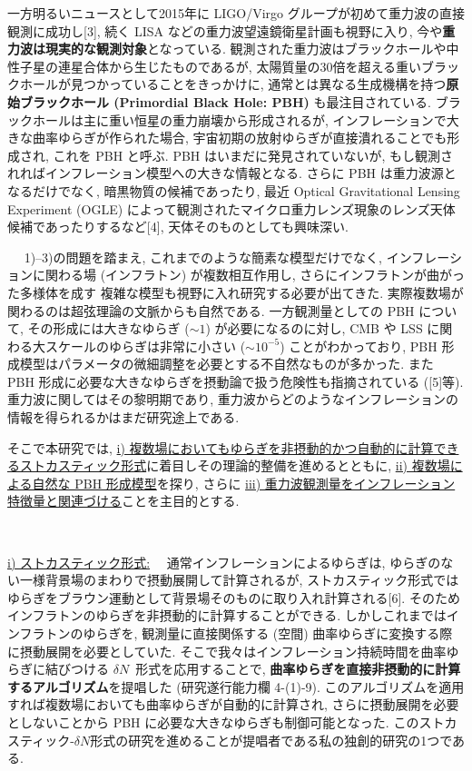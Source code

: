 \documentclass[11pt,a4paper,uplatex,twoside,dvipdfmx]{ujarticle} 	%
\renewcommand{\emph}[1]{{\sffamily\gtfamily\bfseries #1}}
\newcommand{\subject}[1]{\noindent{\sffamily\gtfamily\bfseries #1}~~}
\newcommand{\subsubject}[1]{\noindent \ul{#1}~~}
\newcommand{\研究課題名}{\mgfamily ストカスティック形式、原始ブラックホール、重力波観測から迫るインフレーション}
\newcommand{\研究機関名}{\mgfamily 名古屋大学}
\newcommand{\申請者氏名}{\mgfamily 多田 祐一郎}
\newcommand{\研究代表者氏名}{\申請者氏名}
\newcommand{\研究期間の最終元号年度}{34}	%
\begin{document}
{	一方明るいニュースとして2015年に LIGO/Virgo グループが初めて重力波の直接観測に成功し[3],
	続く LISA などの重力波望遠鏡衛星計画も視野に入り, 今や\emph{重力波は現実的な観測対象}となっている.
	観測された重力波はブラックホールや中性子星の連星合体から生じたものであるが,
	太陽質量の30倍を超える重いブラックホールが見つかっていることをきっかけに, 通常とは異なる生成機構を持つ\emph{原始ブラックホール (Primordial Black Hole: PBH)} も最注目されている.
	ブラックホールは主に重い恒星の重力崩壊から形成されるが, インフレーションで大きな曲率ゆらぎが作られた場合, 宇宙初期の放射ゆらぎが直接潰れることでも形成され, これを PBH と呼ぶ.
	PBH はいまだに発見されていないが, もし観測されればインフレーション模型への大きな情報となる. 
	さらに PBH は重力波源となるだけでなく, 暗黒物質の候補であったり, 最近 Optical Gravitational Lensing Experiment (OGLE) によって観測されたマイクロ重力レンズ現象のレンズ天体候補であったりするなど[4],
	天体そのものとしても興味深い.
	
	
	
	\vspace{3pt}
	\subject{2. 問題点および解決方策}
	1)--3)の問題を踏まえ, これまでのような簡素な模型だけでなく,
	インフレーションに関わる場 (インフラトン) が複数相互作用し, さらにインフラトンが曲がった多様体を成す
	複雑な模型も視野に入れ研究する必要が出てきた. 実際複数場が関わるのは超弦理論の文脈からも自然である.
	一方観測量としての PBH について, その形成には大きなゆらぎ ($\sim1$) が必要になるのに対し, CMB や LSS に関わる大スケールのゆらぎは非常に小さい ($\sim10^{-5}$) ことがわかっており,
	PBH 形成模型はパラメータの微細調整を必要とする不自然なものが多かった.
	また PBH 形成に必要な大きなゆらぎを摂動論で扱う危険性も指摘されている ([5]等).
	重力波に関してはその黎明期であり, 重力波からどのようなインフレーションの情報を得られるかはまだ研究途上である.
	
	そこで本研究では, \ul{i) 複数場においてもゆらぎを非摂動的かつ自動的に計算できるストカスティック形式}に着目しその理論的整備を進めるとともに,
	\ul{ii) 複数場による自然な PBH 形成模型}を探り, さらに \ul{iii) 重力波観測量をインフレーション特徴量と関連づける}ことを主目的とする.
	
	
	\vspace{3pt}
	\subject{3. 研究目的・方法および独創性}
	
	\subsubject{i) ストカスティック形式:}
	通常インフレーションによるゆらぎは, ゆらぎのない一様背景場のまわりで摂動展開して計算されるが,
	ストカスティック形式ではゆらぎをブラウン運動として背景場そのものに取り入れ計算される[6]. 
	そのためインフラトンのゆらぎを非摂動的に計算することができる.
	しかしこれまではインフラトンのゆらぎを, 観測量に直接関係する (空間) 曲率ゆらぎに変換する際に摂動展開を必要としていた.
	そこで我々はインフレーション持続時間を曲率ゆらぎに結びつける $\delta N$~形式を応用することで,
	\emph{曲率ゆらぎを直接非摂動的に計算するアルゴリズム}を提唱した (研究遂行能力欄 4-(1)-9).
	このアルゴリズムを適用すれば複数場においても曲率ゆらぎが自動的に計算され,
	さらに摂動展開を必要としないことから PBH に必要な大きなゆらぎも制御可能となった.
	このストカスティック-$\delta N$形式の研究を進めることが提唱者である私の独創的研究の1つである.
	
}
\end{document}
